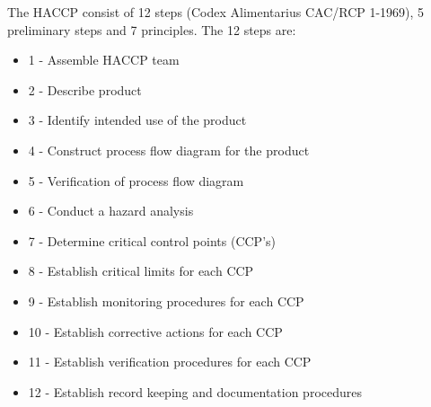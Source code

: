 The HACCP consist of 12 steps (Codex Alimentarius CAC/RCP 1-1969), 5 preliminary steps and 7 principles. The 12 steps are:

\begin{highlight}
    \begin{itemize}
        \item 1 -  Assemble HACCP team
        \item 2 -  Describe product
        \item 3 -  Identify intended use of the product
        \item 4 -  Construct process flow diagram for the product
        \item 5 -  Verification of process flow diagram
        \item 6 -  Conduct a hazard analysis
        \item 7 -  Determine critical control points (CCP’s)
        \item 8 -  Establish critical limits for each CCP
        \item 9 -  Establish monitoring procedures for each CCP
        \item 10 - Establish corrective actions for each CCP
        \item 11 - Establish verification procedures for each CCP
        \item 12 - Establish record keeping and documentation procedures
    \end{itemize}
\end{highlight}

